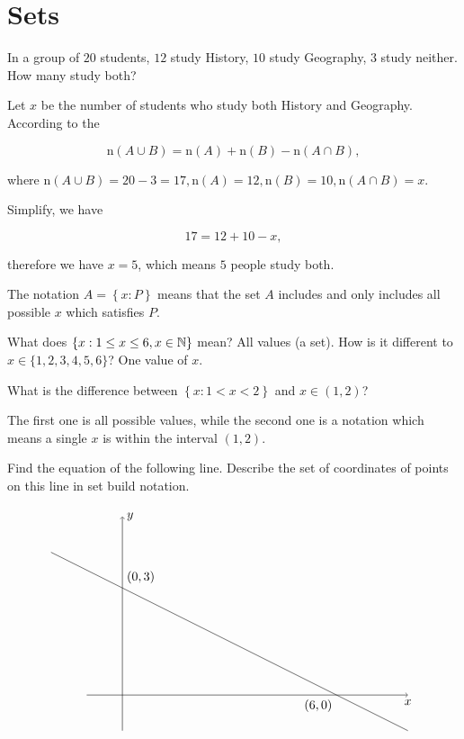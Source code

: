 \documentclass[8pt]{article}
\author{\Author}
\title{\Title}
\date{\Date}
\begin{document}
	\maketitle

	\tableofcontents

	\section{Sets}

		\prob In a group of \(20\) students, \(12\) study History, \(10\) study Geography, \(3\) study neither. How many study both?

		\solution Let \(x\) be the number of students who study both History and Geography. According to the 

		\[\mathrm{n} (A\cup B) = \mathrm{n} (A) + \mathrm{n}(B) - \mathrm{n} (A \cap B),\]

		where \(\mathrm{n} (A \cup B) = 20 - 3 = 17, \mathrm{n}(A) = 12, \mathrm{n}(B) = 10, \mathrm{n}(A \cap B) = x\).

		Simplify, we have

		\[17 = 12 + 10 - x,\]

		therefore we have \(x = 5\), which means \(5\) people study both.\newline

		\defi {} The notation \(A = \left\{x: P\right\}\) means that the set \(A\) includes and only includes all possible \(x\) which satisfies \(P\).

		\exmp {} What does \(\left\{x: 1 \leq x \leq 6, x \in \mathbb{N}\right\}\) mean? All values (a set). How is it different to \(x \in \{1, 2, 3, 4, 5, 6\}\)? One value of \(x\).\newline

		\prob What is the difference between \(\left\{x: 1 < x < 2\right\}\) and \(x \in (1, 2)\)?

		\solution The first one is all possible values, while the second one is a notation which means a single \(x\) is within the interval \((1, 2)\).\newline

		\exmp {} Find the equation of the following line. Describe the set of coordinates of points on this line in set build notation.

		\[
		\begin{tikzpicture}
			\draw[black, ->] (-1, 0)--(8, 0) node[below] {\(x\)};
			\draw[black, ->] (0, -1)--(0, 5) node[right] {\(y\)};
			\draw[black] (-2, 4)--(0, 3)--(6, 0)--(8, -1) node at (0, 3) [anchor = south west] {\((0, 3)\)} node at (6, 0) [anchor = north east] {\((6, 0)\)};
		\end{tikzpicture}
		\]
\end{document}
